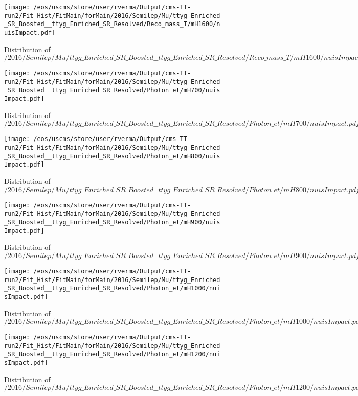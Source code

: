 \begin{figure}
\centering
\texttt{[image: /eos/uscms/store/user/rverma/Output/cms-TT-run2/Fit\_Hist/FitMain/forMain/2016/Semilep/Mu/ttyg\_Enriched\_SR\_Boosted\_\_ttyg\_Enriched\_SR\_Resolved/Reco\_mass\_T/mH1600/nuisImpact.pdf]}
\caption{Distribution of $/2016/Semilep/Mu/ttyg\_Enriched\_SR\_Boosted\_\_ttyg\_Enriched\_SR\_Resolved/Reco\_mass\_T/mH1600/nuisImpact.pdf$}
\end{figure}

\begin{figure}
\centering
\texttt{[image: /eos/uscms/store/user/rverma/Output/cms-TT-run2/Fit\_Hist/FitMain/forMain/2016/Semilep/Mu/ttyg\_Enriched\_SR\_Boosted\_\_ttyg\_Enriched\_SR\_Resolved/Photon\_et/mH700/nuisImpact.pdf]}
\caption{Distribution of $/2016/Semilep/Mu/ttyg\_Enriched\_SR\_Boosted\_\_ttyg\_Enriched\_SR\_Resolved/Photon\_et/mH700/nuisImpact.pdf$}
\end{figure}

\begin{figure}
\centering
\texttt{[image: /eos/uscms/store/user/rverma/Output/cms-TT-run2/Fit\_Hist/FitMain/forMain/2016/Semilep/Mu/ttyg\_Enriched\_SR\_Boosted\_\_ttyg\_Enriched\_SR\_Resolved/Photon\_et/mH800/nuisImpact.pdf]}
\caption{Distribution of $/2016/Semilep/Mu/ttyg\_Enriched\_SR\_Boosted\_\_ttyg\_Enriched\_SR\_Resolved/Photon\_et/mH800/nuisImpact.pdf$}
\end{figure}

\begin{figure}
\centering
\texttt{[image: /eos/uscms/store/user/rverma/Output/cms-TT-run2/Fit\_Hist/FitMain/forMain/2016/Semilep/Mu/ttyg\_Enriched\_SR\_Boosted\_\_ttyg\_Enriched\_SR\_Resolved/Photon\_et/mH900/nuisImpact.pdf]}
\caption{Distribution of $/2016/Semilep/Mu/ttyg\_Enriched\_SR\_Boosted\_\_ttyg\_Enriched\_SR\_Resolved/Photon\_et/mH900/nuisImpact.pdf$}
\end{figure}

\begin{figure}
\centering
\texttt{[image: /eos/uscms/store/user/rverma/Output/cms-TT-run2/Fit\_Hist/FitMain/forMain/2016/Semilep/Mu/ttyg\_Enriched\_SR\_Boosted\_\_ttyg\_Enriched\_SR\_Resolved/Photon\_et/mH1000/nuisImpact.pdf]}
\caption{Distribution of $/2016/Semilep/Mu/ttyg\_Enriched\_SR\_Boosted\_\_ttyg\_Enriched\_SR\_Resolved/Photon\_et/mH1000/nuisImpact.pdf$}
\end{figure}

\begin{figure}
\centering
\texttt{[image: /eos/uscms/store/user/rverma/Output/cms-TT-run2/Fit\_Hist/FitMain/forMain/2016/Semilep/Mu/ttyg\_Enriched\_SR\_Boosted\_\_ttyg\_Enriched\_SR\_Resolved/Photon\_et/mH1200/nuisImpact.pdf]}
\caption{Distribution of $/2016/Semilep/Mu/ttyg\_Enriched\_SR\_Boosted\_\_ttyg\_Enriched\_SR\_Resolved/Photon\_et/mH1200/nuisImpact.pdf$}
\end{figure}

